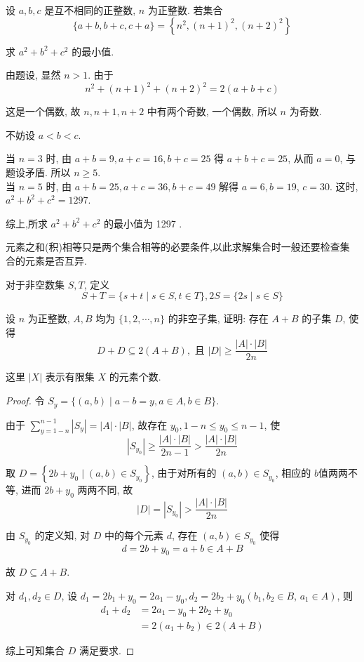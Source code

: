 \begin{example}
	设 $a ,  b ,  c$ 是互不相同的正整数, $n$ 为正整数. 若集合
	$$
		\{a+b, b+c, c+a\}=\left\{n^{2},(n+1)^{2},(n+2)^{2}\right\}
	$$

	求 $a^{2}+b^{2}+c^{2}$ 的最小值.
\end{example}

\begin{solution}
	由题设, 显然 $n>1$. 由于
	$$
		n^{2}+(n+1)^{2}+(n+2)^{2}=2(a+b+c)
	$$

	这是一个偶数, 故 $n ,  n+1 ,  n+2$ 中有两个奇数, 一个偶数, 所以 $n$ 为奇数.

	不妨设 $a<b<c$.

	当 $n=3$ 时, 由 $a+b=9, a+c=16, b+c=25$ 得 $a+b+c=25$, 从而 $a=0$, 与题设矛盾. 所以 $n \geqslant 5$.\\
	当 $n=5$ 时, 由 $a+b=25, a+c=36, b+c=49$ 解得 $a=6, b=19$, $c=30$. 这时, $a^{2}+b^{2}+c^{2}=1297$.

	综上,所求 $a^{2}+b^{2}+c^{2}$ 的最小值为 1297 .
\end{solution}

\begin{note}
	元素之和(积)相等只是两个集合相等的必要条件,以此求解集合时一般还要检查集合的元素是否互异.
\end{note}

\begin{example}\label{ex:6}
	对于非空数集 $S ,  T$, 定义
	$$
		S+T=\{s+t \mid s \in S, t \in T\}, 2 S=\{2 s \mid s \in S\}
	$$

	设 $n$ 为正整数, $A ,  B$ 均为 $\{1,2, \cdots, n\}$ 的非空子集, 证明: 存在 $A+B$ 的子集 $D$, 使得
	$$
		D+D \subseteq 2(A+B), \text { 且 }|D| \geqslant \frac{|A| \cdot|B|}{2 n}
	$$

	这里 $|X|$ 表示有限集 $X$ 的元素个数.
\end{example}

\begin{proof}
	令 $S_{y}=\{(a, b) \mid a-b=y, a \in A, b \in B\}$.

	由于 $\sum_{y=1-n}^{n-1}\left|S_{y}\right|=|A| \cdot|B|$, 故存在 $y_{0}, 1-n \leqslant y_{0} \leqslant n-1$, 使
	$$
		\left|S_{y_{0}}\right| \geqslant \frac{|A| \cdot|B|}{2 n-1}>\frac{|A| \cdot|B|}{2 n}
	$$

	取 $D=\left\{2 b+y_{0} \mid(a, b) \in S_{y_{0}}\right\}$, 由于对所有的 $(a, b) \in S_{y_{0}}$, 相应的 $b$值两两不等, 进而 $2 b+y_{0}$ 两两不同, 故
	$$
		|D|=\left|S_{y_{0}}\right|>\frac{|A| \cdot|B|}{2 n}
	$$

	由 $S_{y_{0}}$ 的定义知, 对 $D$ 中的每个元素 $d$, 存在 $(a, b) \in S_{y_{0}}$ 使得
	$$
		d=2 b+y_{0}=a+b \in A+B
	$$

	故 $D \subseteq A+B$.

	对 $d_{1}, d_{2} \in D$, 设 $d_{1}=2 b_{1}+y_{0}=2 a_{1}-y_{0}, d_{2}=2 b_{2}+y_{0}\left(b_{1}, b_{2} \in B\right.$, $\left.a_{1} \in A\right)$, 则
	$$
		\begin{aligned}
			d_{1}+d_{2} & =2 a_{1}-y_{0}+2 b_{2}+y_{0}          \\
			            & =2\left(a_{1}+b_{2}\right) \in 2(A+B)
		\end{aligned}
	$$

	综上可知集合 $D$ 满足要求.
\end{proof}

